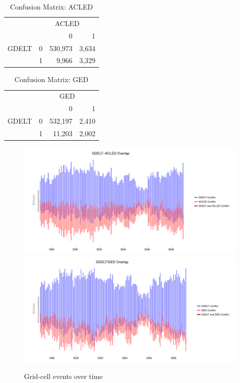 \documentclass[hidelinks]{article}
\begin{document}
\begin{table}[ht]
\centering
\begin{tabular}{rrrr}
  \hline
   &  \multicolumn{3}{c}{ACLED}\\
& & 0 & 1 \\ 
 \hline
GDELT 	& 0 	& 530,973 	& 3,634 \\ 
 		&  1 	& 9,966 		& 3,329 \\ 
   \hline
\end{tabular}
\caption{Confusion Matrix: ACLED} 
\end{table}


\begin{table}[ht]
\centering
\begin{tabular}{rrrr}
  \hline
 &  \multicolumn{3}{c}{GED}\\
& & 0 & 1 \\ 
  \hline
GDELT 	& 0 	& 532,197 & 2,410 \\ 
 		&  1 	& 11,203 & 2,002 \\ 
   \hline
\end{tabular}
\caption{Confusion Matrix: GED} 
\end{table}


\vfill

\newpage
\begin{figure}[!htbp]
\includegraphics[width = 1 \textwidth]{timeACLEDAppendixBPermissive.pdf}\\
\includegraphics[width = 1 \textwidth]{timeGEDAppendixBPermissive.pdf}
\caption{Grid-cell events over time}\label{fig:correlations_time}
\end{figure}
\end{document}
